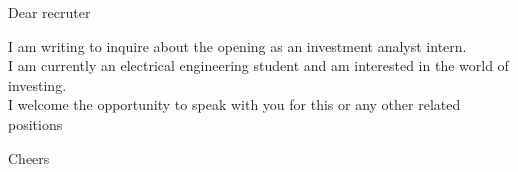 \documentclass[12pt]{letter}
\begin{document}

\begin{letter}{}
\address{Montréal, Canada}

\opening{Dear recruter}

I am writing to inquire about the opening as an investment analyst intern.\\
I am currently an electrical engineering student and am interested in the world of investing.\\
I welcome the opportunity to speak with you for this or any other related positions
\signature{Maxime}

\closing{Cheers}


\end{letter}
\end{document}
